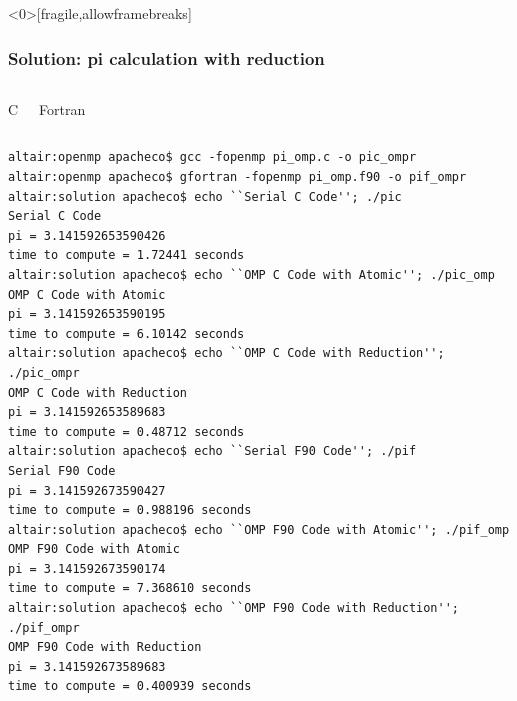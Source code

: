\documentclass[10pt,t]{beamer}
\begin{document}
\begin{frame}<0>[fragile,allowframebreaks]
  \frametitle{Solution: pi calculation with reduction}
  \begin{columns}
    \column{5cm}
    \begin{exampleblock}{C }
      
    \end{exampleblock}
    \column{5cm}
    \begin{exampleblock}{Fortran}
      
    \end{exampleblock}
  \end{columns}
  \begin{block}{}
    {\tiny
      \begin{verbatim}
altair:openmp apacheco$ gcc -fopenmp pi_omp.c -o pic_ompr
altair:openmp apacheco$ gfortran -fopenmp pi_omp.f90 -o pif_ompr
altair:solution apacheco$ echo ``Serial C Code''; ./pic
Serial C Code
pi = 3.141592653590426
time to compute = 1.72441 seconds
altair:solution apacheco$ echo ``OMP C Code with Atomic''; ./pic_omp
OMP C Code with Atomic
pi = 3.141592653590195
time to compute = 6.10142 seconds
altair:solution apacheco$ echo ``OMP C Code with Reduction''; ./pic_ompr
OMP C Code with Reduction
pi = 3.141592653589683
time to compute = 0.48712 seconds
altair:solution apacheco$ echo ``Serial F90 Code''; ./pif
Serial F90 Code
pi = 3.141592673590427
time to compute = 0.988196 seconds
altair:solution apacheco$ echo ``OMP F90 Code with Atomic''; ./pif_omp
OMP F90 Code with Atomic
pi = 3.141592673590174
time to compute = 7.368610 seconds
altair:solution apacheco$ echo ``OMP F90 Code with Reduction''; ./pif_ompr
OMP F90 Code with Reduction
pi = 3.141592673589683
time to compute = 0.400939 seconds
      \end{verbatim}
    }
  \end{block}
\end{frame}
\end{document}
